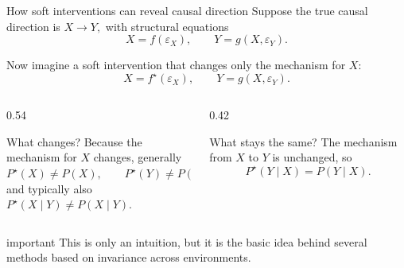 \documentclass[dvipsnames,aspectratio=169,handout]{beamer}
\begin{document}
\begin{frame}{How soft interventions can reveal causal direction}
Suppose the true causal direction is
$
X \longrightarrow Y,
$
with structural equations
\[
X = f(\varepsilon_X),
\qquad
Y = g(X,\varepsilon_Y).
\]

Now imagine a soft intervention that changes only the mechanism for $X$:
\[
X = f^\star(\varepsilon_X),
\qquad
Y = g(X,\varepsilon_Y).
\]
\vspace{-7mm}
\begin{columns}[T]
\begin{column}{0.54\textwidth}
\begin{block}{What changes?}
Because the mechanism for $X$ changes, generally\\[1mm]
\qquad \qquad $
P^\star(X)\neq P(X),
\qquad
P^\star(Y)\neq P(Y),
$\\[1mm]
and typically also\\[1mm]
\qquad \qquad \qquad $
P^\star(X\mid Y)\neq P(X\mid Y).
$
\end{block}
\end{column}

\begin{column}{0.42\textwidth}
\begin{block}{What stays the same?}
The mechanism from $X$ to $Y$ is unchanged, so
\[
P^\star(Y\mid X)=P(Y\mid X).
\]
\end{block}
\end{column}
\end{columns}

\smallskip
\begin{beamercolorbox}[wd=\textwidth,sep=7pt,center,rounded=true,shadow=true]{important}
This is only an intuition, but it is the basic idea behind several methods based on invariance across environments.
\end{beamercolorbox}
\end{frame}
\end{document}
